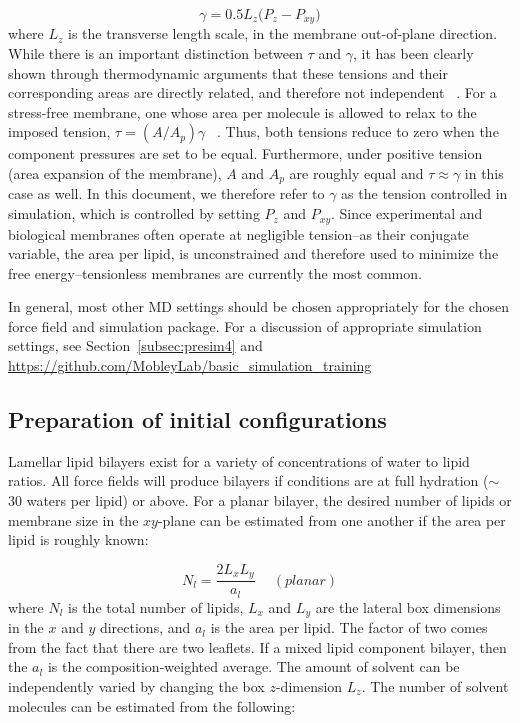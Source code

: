 \documentclass[9pt,bestpractices,pubversion]{livecoms}
\begin{document}
\begin{equation}\label{eq:1}
	\gamma =0.5 L_z\big(P_z-P_{xy}\big)
\end{equation}
where $L_z$ is the transverse length scale, in the membrane out-of-plane direction.
While there is an important distinction between $\tau$ and $\gamma$, it has been clearly shown through thermodynamic arguments that these tensions and their corresponding areas are directly related, and therefore not independent ~\cite{Diamant2011}.
For a stress-free membrane, one whose area per molecule is allowed to relax to the imposed tension, $\tau = (A/A_p) \gamma$ ~\cite{Diamant2011}.
Thus, both tensions reduce to zero when the component pressures are set to be equal.
Furthermore, under positive tension (area expansion of the membrane), $A$ and $A_p$ are roughly equal and $\tau \approx \gamma$ in this case as well.
In this document, we therefore refer to $\gamma$ as the tension controlled in simulation, which is controlled by setting $P_{z}$ and $P_{xy}$.
Since experimental and biological membranes often operate at negligible tension--as their conjugate variable, the area per lipid, is unconstrained and therefore used to minimize the free energy--tensionless membranes are currently the most common.

In general, most other MD settings should be chosen appropriately for the chosen force field and simulation package.
For a discussion of appropriate simulation settings, see Section~\ref{subsec:presim4} and \url{https://github.com/MobleyLab/basic_simulation_training}

\subsection{Preparation of initial configurations}
\label{prepconf3}
Lamellar lipid bilayers exist for a variety of concentrations of water to lipid ratios.
All force fields will produce bilayers if conditions are at full hydration ($\sim$30 waters per lipid) or above.
For a planar bilayer, the desired number of lipids or membrane size in the $xy$-plane can be estimated from one another if the area per lipid is roughly known:

\begin{equation}\label{eq:2}
	N_l = \frac{2 L_x L_y}{a_l}\ \quad (planar)
\end{equation}
where $N_l$ is the total number of lipids, $L_x$ and $L_y$ are the lateral box dimensions in the $x$ and $y$ directions, and $a_l$ is the area per lipid.
The factor of two comes from the fact that there are two leaflets.
If a mixed lipid component bilayer, then the $a_l$ is the composition-weighted average.
The amount of solvent can be independently varied by changing the box $z$-dimension $L_z$. The number of solvent molecules can be estimated from the following:
\end{document}
